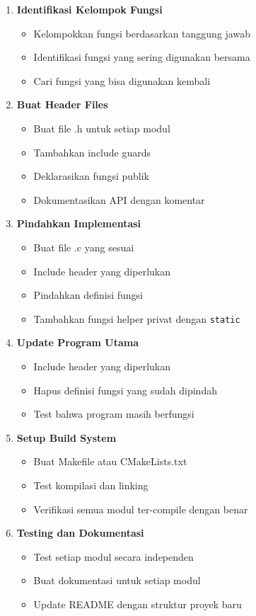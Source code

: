 \documentclass[../main.tex]{subfiles}
\begin{document}
\begin{enumerate}
  \item \textbf{Identifikasi Kelompok Fungsi}
  \begin{itemize}
    \item Kelompokkan fungsi berdasarkan tanggung jawab
    \item Identifikasi fungsi yang sering digunakan bersama
    \item Cari fungsi yang bisa digunakan kembali
  \end{itemize}
  
  \item \textbf{Buat Header Files}
  \begin{itemize}
    \item Buat file .h untuk setiap modul
    \item Tambahkan include guards
    \item Deklarasikan fungsi publik
    \item Dokumentasikan API dengan komentar
  \end{itemize}
  
  \item \textbf{Pindahkan Implementasi}
  \begin{itemize}
    \item Buat file .c yang sesuai
    \item Include header yang diperlukan
    \item Pindahkan definisi fungsi
    \item Tambahkan fungsi helper privat dengan \texttt{static}
  \end{itemize}
  
  \item \textbf{Update Program Utama}
  \begin{itemize}
    \item Include header yang diperlukan
    \item Hapus definisi fungsi yang sudah dipindah
    \item Test bahwa program masih berfungsi
  \end{itemize}
  
  \item \textbf{Setup Build System}
  \begin{itemize}
    \item Buat Makefile atau CMakeLists.txt
    \item Test kompilasi dan linking
    \item Verifikasi semua modul ter-compile dengan benar
  \end{itemize}
  
  \item \textbf{Testing dan Dokumentasi}
  \begin{itemize}
    \item Test setiap modul secara independen
    \item Buat dokumentasi untuk setiap modul
    \item Update README dengan struktur proyek baru
  \end{itemize}
\end{enumerate}
\end{document}
